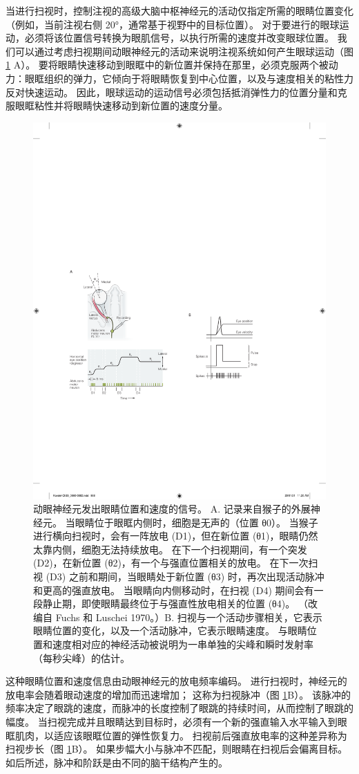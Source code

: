 当进行扫视时，控制注视的高级大脑中枢神经元的活动仅指定所需的眼睛位置变化（例如，当前注视右侧 20°，通常基于视野中的目标位置）。 对于要进行的眼球运动，必须将该位置信号转换为眼肌信号，以执行所需的速度并改变眼球位置。 
我们可以通过考虑扫视期间动眼神经元的活动来说明注视系统如何产生眼球运动（图 \ref{fig:35_7} A）。 
要将眼睛快速移动到眼眶中的新位置并保持在那里，必须克服两个被动力：眼眶组织的弹力，它倾向于将眼睛恢复到中心位置，以及与速度相关的粘性力 反对快速运动。 因此，眼球运动的运动信号必须包括抵消弹性力的位置分量和克服眼眶粘性并将眼睛快速移动到新位置的速度分量。

\begin{figure}[htbp]
	\centering
	\includegraphics[width=0.5\linewidth]{chap35/fig_35_7}
	\caption{动眼神经元发出眼睛位置和速度的信号。 A. 记录来自猴子的外展神经元。 当眼睛位于眼眶内侧时，细胞是无声的（位置 θ0）。 当猴子进行横向扫视时，会有一阵放电 (D1)，但在新位置 (θ1)，眼睛仍然太靠内侧，细胞无法持续放电。 在下一个扫视期间，有一个突发 (D2)，在新位置 (θ2)，有一个与强直位置相关的放电。 在下一次扫视 (D3) 之前和期间，当眼睛处于新位置 (θ3) 时，再次出现活动脉冲和更高的强直放电。 当眼睛向内侧移动时，在扫视 (D4) 期间会有一段静止期，即使眼睛最终位于与强直性放电相关的位置 (θ4)。 （改编自 Fuchs 和 Luschei 1970。）B. 扫视与一个活动步骤相关，它表示眼睛位置的变化，以及一个活动脉冲，它表示眼睛速度。 与眼睛位置和速度相对应的神经活动被说明为一串单独的尖峰和瞬时发射率（每秒尖峰）的估计。}
	\label{fig:35_7}
\end{figure}

这种眼睛位置和速度信息由动眼神经元的放电频率编码。 进行扫视时，神经元的放电率会随着眼动速度的增加而迅速增加； 这称为扫视脉冲（图 \ref{fig:35_7}B）。 该脉冲的频率决定了眼跳的速度，而脉冲的长度控制了眼跳的持续时间，从而控制了眼跳的幅度。 当扫视完成并且眼睛达到目标时，必须有一个新的强直输入水平输入到眼眶肌肉，以适应该眼眶位置的弹性恢复力。 扫视前后强直放电率的这种差异称为扫视步长（图 \ref{fig:35_7}B）。 如果步幅大小与脉冲不匹配，则眼睛在扫视后会偏离目标。 如后所述，脉冲和阶跃是由不同的脑干结构产生的。

